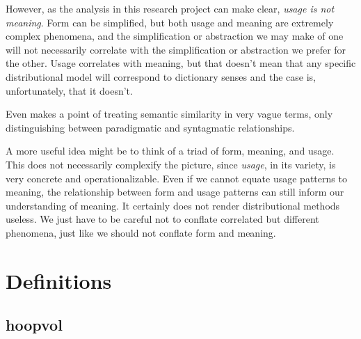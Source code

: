 \documentclass[
]{book}
\begin{document}
However, as the analysis in this research project can make clear, \emph{usage is not meaning}.
Form can be simplified, but both usage and meaning are extremely complex phenomena,
and the simplification or abstraction we may make of one will not necessarily correlate
with the simplification or abstraction we prefer for the other. Usage correlates with
meaning, but that doesn't mean that any specific distributional model will correspond
to dictionary senses and the case is, unfortunately, that it doesn't.

Even \textcite{sahlgren_2006} makes a point of treating semantic similarity in very vague terms,
only distinguishing between paradigmatic and syntagmatic relationships.

A more useful idea might be to think of a triad of form, meaning, and usage. This
does not necessarily complexify the picture, since \emph{usage}, in its variety, is very
concrete and operationalizable. Even if we cannot equate usage patterns to meaning,
the relationship between form and usage patterns can still inform our understanding of
meaning. It certainly does not render distributional methods useless. We just have
to be careful not to conflate correlated but different phenomena, just like we should
not conflate form and meaning.

\hypertarget{appendix-appendix}{%
\appendix}


\hypertarget{definitions}{%
\chapter{Definitions}\label{definitions}}

\hypertarget{hoopvol}{%
\section{hoopvol}\label{hoopvol}}

\providecommand{\docline}[3]{\noalign{\global\setlength{\arrayrulewidth}{#1}}\arrayrulecolor[HTML]{#2}\cline{#3}}

\setlength{\tabcolsep}{2pt}

\renewcommand*{\arraystretch}{1.5}
\end{document}
